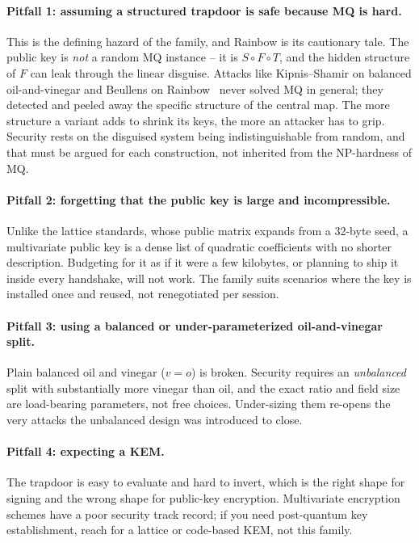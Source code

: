 \paragraph{Pitfall 1: assuming a structured trapdoor is safe because MQ is hard.}
This is the defining hazard of the family, and Rainbow is its cautionary tale. The public key is \emph{not} a random MQ instance -- it is $S \circ F \circ T$, and the hidden structure of $F$ can leak through the linear disguise. Attacks like Kipnis--Shamir on balanced oil-and-vinegar and Beullens on Rainbow~\cite{beullens2022} never solved MQ in general; they detected and peeled away the specific structure of the central map. The more structure a variant adds to shrink its keys, the more an attacker has to grip. Security rests on the disguised system being indistinguishable from random, and that must be argued for each construction, not inherited from the NP-hardness of MQ.

\paragraph{Pitfall 2: forgetting that the public key is large and incompressible.}
Unlike the lattice standards, whose public matrix expands from a 32-byte seed, a multivariate public key is a dense list of quadratic coefficients with no shorter description. Budgeting for it as if it were a few kilobytes, or planning to ship it inside every handshake, will not work. The family suits scenarios where the key is installed once and reused, not renegotiated per session.

\paragraph{Pitfall 3: using a balanced or under-parameterized oil-and-vinegar split.}
Plain balanced oil and vinegar ($v = o$) is broken. Security requires an \emph{unbalanced} split with substantially more vinegar than oil, and the exact ratio and field size are load-bearing parameters, not free choices. Under-sizing them re-opens the very attacks the unbalanced design was introduced to close.

\paragraph{Pitfall 4: expecting a KEM.}
The trapdoor is easy to evaluate and hard to invert, which is the right shape for signing and the wrong shape for public-key encryption. Multivariate encryption schemes have a poor security track record; if you need post-quantum key establishment, reach for a lattice or code-based KEM, not this family.

